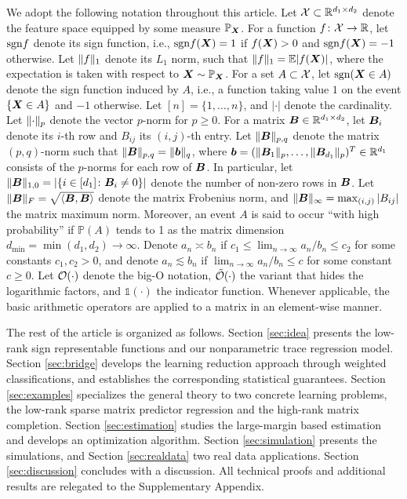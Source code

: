 \documentclass[aos]{imsart}
\theoremstyle{definition}
\def\sign{\textup{sgn}}
\begin{document}
We adopt the following notation throughout this article. Let $\mathcal{X} \subset \mathbb{R}^{d_1\times d_2}$ denote the feature space equipped by some measure $\mathbb{P}_{\bm X}$. For a function $f\colon \mathcal{X} \to \mathbb{R}$, let $\sign f$ denote its sign function, i.e., $\sign f(\mX)=1$ if $f(\bm X)>0$ and $\sign f(\mX)=-1$ otherwise. Let $\lVert f\rVert_1$ denote its $L_1$ norm, such that $\lVert f\rVert_1=\mathbb{E}|f(\bm X)|$, where the expectation is taken with respect to $\bm X \sim \mathbb{P}_{\bm X}$. For a set $A \subset \mathcal{X}$, let $\sign (\mX\in A)$ denote the sign function induced by $A$, i.e., a function taking value $1$ on the event $\{\bm X\in A\}$ and $-1$ otherwise. Let $[n] = \{1,\ldots,n\}$, and $|\cdot|$ denote the cardinality. Let $\lVert\cdot\rVert_p$ denote the vector $p$-norm for $p\geq 0$. For a matrix $\bm B \in \mathbb{R}^{d_1\times d_2}$, let $\bm B_i$ denote its $i$-th row and $B_{ij}$ its $(i,j)$-th entry. Let $\lVert\bm B\rVert_{p,q}$ denote the matrix $(p,q)$-norm such that $\lVert\bm B\rVert_{p,q}=\lVert\bm{b}\rVert_q$, where $\bm{b}=(\lVert\bm B_1\rVert_p,\ldots,\lVert\bm B_{d_1}\rVert_p)^T\in\mathbb{R}^{d_1}$ consists of the $p$-norms for each row of $\bm B$. In particular, let $\lVert\bm B\rVert_{1,0}=|\{i\in [d_1]\colon \bm B_i\neq 0\}|$ denote the number of non-zero rows in $\bm B$. Let $\lVert\bm B\rVert_F=\sqrt{\langle \bm B, \bm B \rangle}$ denote the matrix Frobenius norm, and $\lVert\bm B\rVert_\infty=\max_{(i,j)}|B_{ij}|$ the matrix maximum norm. Moreover, an event $A$ is said to occur ``with high probability'' if $\mathbb{P}(A)$ tends to 1 as the matrix dimension $d_{\min} = \min(d_1,d_2)\to\infty$. Denote $a_n\asymp b_n$ if $c_1\leq \lim_{n\to \infty} a_n/b_n\leq c_2$ for some constants $c_1,c_2>0$, and denote $a_n\lesssim b_n$ if $\lim_{n\to\infty} a_n/b_n\leq c$ for some constant $c\geq 0$. Let $\mathcal{O}(\cdot)$ denote the big-O notation, $\tilde {\mathcal{O}}(\cdot)$ the variant that hides the logarithmic factors, and $\mathds{1}(\cdot)$ the indicator function. Whenever applicable, the basic arithmetic operators are applied to a matrix in an element-wise manner. 

The rest of the article is organized as follows. Section \ref{sec:idea} presents the low-rank sign representable functions and our nonparametric trace regression model. Section \ref{sec:bridge} develops the learning reduction approach through weighted classifications, and establishes the corresponding statistical guarantees. Section \ref{sec:examples} specializes the general theory to two concrete learning problems, the low-rank sparse matrix predictor regression and the high-rank matrix completion. Section \ref{sec:estimation} studies the large-margin based estimation and develops an optimization algorithm. Section \ref{sec:simulation} presents the simulations, and Section \ref{sec:realdata} two real data applications. Section \ref{sec:discussion} concludes with a discussion. All technical proofs and additional results are relegated to the Supplementary Appendix. 
\end{document}
